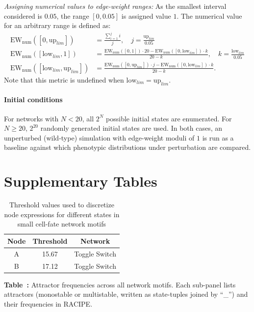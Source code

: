 \documentclass[11pt]{article}
\newcommand{\ewnum}{\mathrm{EW_{num}}}
\begin{document}
\noindent\textit{Assigning numerical values to edge-weight ranges:} As the smallest interval considered is $0.05$, the range $[0, 0.05]$ is assigned value $1$. The numerical value for an arbitrary range is defined as:
\begin{align}
    \ewnum([0, \mathrm{up}_{lim}]) &= \frac{\sum_{i=1}^{j} i}{j}, \quad j = \frac{\mathrm{up}_{lim}}{0.05} \nonumber \\
    \ewnum([\mathrm{low}_{lim}, 1]) &= \frac{\ewnum([0,1]) \cdot 20 - \ewnum([0, \mathrm{low}_{lim}]) \cdot k}{20 - k}, \quad k = \frac{\mathrm{low}_{lim}}{0.05} \nonumber \\
    \ewnum([\mathrm{low}_{lim}, \mathrm{up}_{lim}]) &= \frac{\ewnum([0, \mathrm{up}_{lim}]) \cdot j - \ewnum([0, \mathrm{low}_{lim}]) \cdot k}{20 - k}. \label{eq:rw_ew}
\end{align}
Note that this metric is undefined when $\mathrm{low}_{lim} = \mathrm{up}_{lim}$.


\paragraph{Initial conditions} For networks with $N < 20$, all $2^N$ possible initial states are enumerated. For $N \geq 20$, $2^{20}$ randomly generated initial states are used. In both cases, an unperturbed (wild-type) simulation with edge-weight moduli of $1$ is run as a baseline against which phenotypic distributions under perturbation are compared.

\section{Supplementary Tables}

\begin{table}[h!]
\centering
\caption{\normalsize{Threshold values used to discretize node expressions for different states in small cell-fate network motifs}}
\label{tb:Thresholds}
\begin{tabular}{|c|c|c|}
    \hline
    \textbf{Node} &  \textbf{Threshold} & \textbf{Network}\\
    \hline\hline
    A & 15.67 & Toggle Switch\\
    \hline
    B & 17.12 & Toggle Switch\\
    \hline
    
\end{tabular}


\end{table}


\noindent
{}
\label{tb:Attractors}
\begin{center}
  \small{\textbf{Table~\thetable: }}Attractor frequencies across all network motifs.
  Each sub-panel lists attractors (monostable or multistable, written as
  state-tuples joined by ``\_'') and their frequencies in RACIPE.
\end{center}
\end{document}
